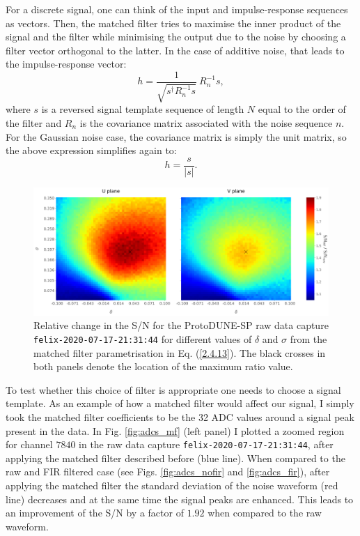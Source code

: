 For a discrete signal, one can think of the input and impulse-response sequences as vectors. Then, the matched filter tries to maximise the inner product of the signal and the filter while minimising the output due to the noise by choosing a filter vector orthogonal to the latter. In the case of additive noise, that leads to the impulse-response vector:
\begin{equation}\label{2.4.11}
	h = \frac{1}{\sqrt{s^{\dagger} R_{n}^{-1} s}} \ R_{n}^{-1} s,
\end{equation}
where $s$ is a reversed signal template sequence of length $N$ equal to the order of the filter and $R_{n}$ is the covariance matrix associated with the noise sequence $n$. For the Gaussian noise case, the covariance matrix is simply the unit matrix, so the above expression simplifies again to:
\begin{equation}\label{2.4.12}
	h = \frac{s}{|s|}.
\end{equation}

\begin{figure}[t]
	\centering
	\includegraphics[width=1\linewidth]{Images/Matched_Filter/mf_fir_opt.png}
	\caption[Relative change in the S/N for the ProtoDUNE-SP raw data capture for different values of $\delta$ and $\sigma$ from the matched filter parametrisation.]{Relative change in the S/N for the ProtoDUNE-SP raw data capture \texttt{felix-2020-07-17-21:31:44} for different values of $\delta$ and $\sigma$ from the matched filter parametrisation in Eq. (\ref{2.4.13}). The black crosses in both panels denote the location of the maximum ratio value.}
	\label{fig:mf_opt}
\end{figure}

To test whether this choice of filter is appropriate one needs to choose a signal template. As an example of how a matched filter would affect our signal, I simply took the matched filter coefficients to be the 32 ADC values around a signal peak present in the data. In Fig. \ref{fig:adcs_mf} (left panel) I plotted a zoomed region for channel $7840$ in the raw data capture \texttt{felix-2020-07-17-21:31:44}, after applying the matched filter described before (blue line). When compared to the raw and FIR filtered case (see Figs. \ref{fig:adcs_nofir} and \ref{fig:adcs_fir}), after applying the matched filter the standard deviation of the noise waveform (red line) decreases and at the same time the signal peaks are enhanced. This leads to an improvement of the S/N by a factor of $1.92$ when compared to the raw waveform.

